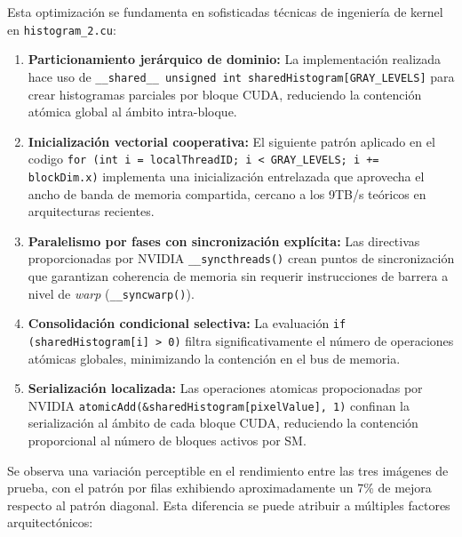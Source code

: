         Esta optimización se fundamenta en sofisticadas técnicas de ingeniería de kernel en \texttt{histogram\_2.cu}:

        \begin{enumerate}

            \item \textbf{Particionamiento jerárquico de dominio:} La implementación realizada hace uso de 
 \texttt{\_\_shared\_\_ unsigned int sharedHistogram[GRAY\_LEVELS]} para crear histogramas parciales por bloque CUDA, reduciendo la contención atómica global al ámbito intra-bloque.
            
            \item \textbf{Inicialización vectorial cooperativa:} El siguiente patrón aplicado en el codigo \texttt{for (int i = localThreadID; i < GRAY\_LEVELS; i += blockDim.x)} implementa una inicialización entrelazada que aprovecha el ancho de banda de memoria compartida, cercano a los 9TB/s teóricos en arquitecturas recientes.
            
            \item \textbf{Paralelismo por fases con sincronización explícita:} Las directivas proporcionadas por NVIDIA \texttt{\_\_syncthreads()} crean puntos de sincronización que garantizan coherencia de memoria sin requerir instrucciones de barrera a nivel de \textit{warp} (\texttt{\_\_syncwarp()}).
            
            \item \textbf{Consolidación condicional selectiva:} La evaluación \texttt{if (sharedHistogram[i] > 0)} filtra significativamente el número de operaciones atómicas globales, minimizando la contención en el bus de memoria.
            
            \item \textbf{Serialización localizada:} Las operaciones atomicas propocionadas por NVIDIA \texttt{atomicAdd(\&sharedHistogram[pixelValue], 1)} confinan la serialización al ámbito de cada bloque CUDA, reduciendo la contención proporcional al número de bloques activos por SM.
            
        \end{enumerate}
        
        Se observa una variación perceptible en el rendimiento entre las tres imágenes de prueba, con el patrón por filas exhibiendo aproximadamente un 7\% de mejora respecto al patrón diagonal. Esta diferencia se puede atribuir a múltiples factores arquitectónicos:

